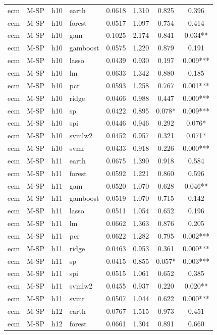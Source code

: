 \begin{ThreePartTable}
\begin{longtable}[t]{llclcccc}
\addlinespace
ecm & M-SP & h10 & earth & 0.0618 & 1.310 & 0.825 & 0.396\\
ecm & M-SP & h10 & forest & 0.0517 & 1.097 & 0.754 & 0.414\\
ecm & M-SP & h10 & gam & 0.1025 & 2.174 & 0.841 & 0.034**\\
ecm & M-SP & h10 & gamboost & 0.0575 & 1.220 & 0.879 & 0.191\\
ecm & M-SP & h10 & lasso & 0.0439 & 0.930 & 0.197 & 0.009***\\
ecm & M-SP & h10 & lm & 0.0633 & 1.342 & 0.880 & 0.185\\
ecm & M-SP & h10 & pcr & 0.0593 & 1.258 & 0.767 & 0.001***\\
ecm & M-SP & h10 & ridge & 0.0466 & 0.988 & 0.447 & 0.000***\\
ecm & M-SP & h10 & sp & 0.0422 & 0.895 & 0.078* & 0.009***\\
ecm & M-SP & h10 & spi & 0.0446 & 0.946 & 0.292 & 0.076*\\
ecm & M-SP & h10 & svmlw2 & 0.0452 & 0.957 & 0.321 & 0.071*\\
ecm & M-SP & h10 & svmr & 0.0433 & 0.918 & 0.226 & 0.000***\\
\addlinespace
ecm & M-SP & h11 & earth & 0.0675 & 1.390 & 0.918 & 0.584\\
ecm & M-SP & h11 & forest & 0.0592 & 1.221 & 0.860 & 0.596\\
ecm & M-SP & h11 & gam & 0.0520 & 1.070 & 0.628 & 0.046**\\
ecm & M-SP & h11 & gamboost & 0.0519 & 1.070 & 0.715 & 0.142\\
ecm & M-SP & h11 & lasso & 0.0511 & 1.054 & 0.652 & 0.196\\
ecm & M-SP & h11 & lm & 0.0662 & 1.363 & 0.876 & 0.205\\
ecm & M-SP & h11 & pcr & 0.0622 & 1.282 & 0.795 & 0.002***\\
ecm & M-SP & h11 & ridge & 0.0463 & 0.953 & 0.361 & 0.000***\\
ecm & M-SP & h11 & sp & 0.0415 & 0.855 & 0.057* & 0.003***\\
ecm & M-SP & h11 & spi & 0.0515 & 1.061 & 0.652 & 0.385\\
ecm & M-SP & h11 & svmlw2 & 0.0455 & 0.937 & 0.220 & 0.020**\\
ecm & M-SP & h11 & svmr & 0.0507 & 1.044 & 0.622 & 0.000***\\
\addlinespace
ecm & M-SP & h12 & earth & 0.0767 & 1.515 & 0.973 & 0.451\\
ecm & M-SP & h12 & forest & 0.0661 & 1.304 & 0.891 & 0.660\\

\end{longtable}
\end{ThreePartTable}
